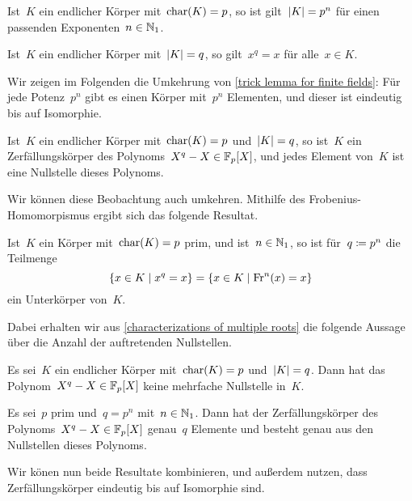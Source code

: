 \begin{proposition}
  Ist~$K$ ein endlicher Körper mit~$\operatorname{char}(K) = p$, so ist gilt~$\lvert K\rvert = p^n$ für einen passenden Exponenten~$n \in \mathbb{N}_1$.
\end{proposition}

\begin{lemma}
  \label{trick lemma for finite fields}
  Ist~$K$ ein endlicher Körper mit~$\lvert K\rvert = q$, so gilt~$x^q = x$ für alle~$x \in K$.
\end{lemma}

Wir zeigen im Folgenden die Umkehrung von \cref{trick lemma for finite fields}:
Für jede Potenz~$p^n$ gibt es einen Körper mit~$p^n$ Elementen, und dieser ist eindeutig bis auf Isomorphie.

\begin{proposition}
  Ist~$K$ ein endlicher Körper mit~$\operatorname{char}(K) = p$ und~$\lvert K\rvert = q$, so ist~$K$ ein Zerfällungskörper des Polynoms~$X^q - X \in \mathbb{F}_p[X]$, und jedes Element von~$K$ ist eine Nullstelle dieses Polynoms.
\end{proposition}

Wir können diese Beobachtung auch umkehren.
Mithilfe des Frobenius-Homomorpismus ergibt sich das folgende Resultat.

\begin{lemma}
  Ist~$K$ ein Körper mit~$\operatorname{char}(K) = p$ prim, und ist~$n \in \mathbb{N}_1$, so ist für~$q \coloneqq p^n$ die Teilmenge
  \[
    \{
      x \in K
    \suchthat
      x^q = x
    \}
    =
    \{
      x \in K
    \suchthat
      \Fr^n(x) = x
    \}
  \]
  ein Unterkörper von~$K$.
\end{lemma}

Dabei erhalten wir aus \cref{characterizations of multiple roots} die folgende Aussage über die Anzahl der auftretenden Nullstellen.

\begin{lemma}
  Es sei~$K$ ein endlicher Körper mit~$\operatorname{char}(K) = p$ und~$\lvert K\rvert = q$.
  Dann hat das Polynom~$X^q - X \in \mathbb{F}_p[X]$ keine mehrfache Nullstelle in~$K$.
\end{lemma}

\begin{proposition}
  Es sei~$p$ prim und~$q = p^n$ mit~$n \in \mathbb{N}_1$.
  Dann hat der Zerfällungskörper des Polynoms~$X^q - X \in \mathbb{F}_p[X]$ genau~$q$ Elemente und besteht genau aus den Nullstellen dieses Polynoms.
\end{proposition}

Wir könen nun beide Resultate kombinieren, und außerdem nutzen, dass Zerfällungskörper eindeutig bis auf Isomorphie sind.

